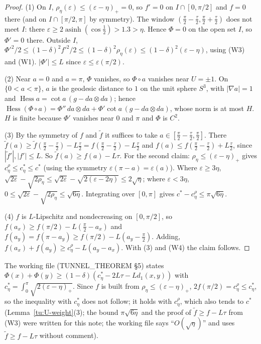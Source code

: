 \begin{proof}
(1) On $I$, $\rho_\eta(\varepsilon)\le(\varepsilon-\eta)_+=0$, so $f'=0$ on $I\cap[0,\pi/2]$ and $f=0$ there (and on
$I\cap[\pi/2,\pi]$ by symmetry). The window $(\frac\pi2-\frac\tau2,\frac\pi2+\frac\tau2)$ does not meet $I$: there
$\varepsilon\ge2\operatorname{asinh}(\cos\frac12)>1.3>\eta$. Hence $\Phi=0$ on the open set $I$, so $\Phi'=0$ there. Outside $I$,
$\Phi'^2/2\le(1-\delta)^2f'^2/2\le(1-\delta)^2\rho_\eta(\varepsilon)\le(1-\delta)^2(\varepsilon-\eta)$, using (W3) and (W1).
$|\Phi'|\le L$ since $\varepsilon\le\varepsilon(\pi/2)$.

(2) Near $a=0$ and $a=\pi$, $\Phi$ vanishes, so $\Phi\circ a$ vanishes near $U=\pm1$. On $\{0<a<\pi\}$, $a$ is the
geodesic distance to $1$ on the unit sphere $S^3$, with $|\nabla a|=1$ and
$\operatorname{Hess}a=\cot a\,(g-da\otimes da)$; hence
$\operatorname{Hess}(\Phi\circ a)=\Phi''\,da\otimes da+\Phi'\cot a\,(g-da\otimes da)$, whose norm is at most $H$. $H$ is finite
because $\Phi'$ vanishes near $0$ and $\pi$ and $\Phi$ is $C^2$.

(3) By the symmetry of $f$ and $\tilde f$ it suffices to take $a\in[\frac\pi2-\frac\tau2,\frac\pi2]$. There
$\tilde f(a)\ge\tilde f(\frac\pi2-\frac\tau2)-L\frac\tau2=f(\frac\pi2-\frac\tau2)-L\frac\tau2$ and
$f(a)\le f(\frac\pi2-\frac\tau2)+L\frac\tau2$, since $|\tilde f'|,|f'|\le L$. So $\tilde f(a)\ge f(a)-L\tau$. For the
second claim: $\rho_\eta\le(\varepsilon-\eta)_+$ gives $c^\rho_\eta\le c^*_\eta\le c^*$ (using the symmetry
$\varepsilon(\pi-a)=\varepsilon(a)$). Where $\varepsilon\ge3\eta$, $\sqrt{2\varepsilon}-\sqrt{2\rho_\eta}\le\sqrt{2\varepsilon}-\sqrt{2(\varepsilon-2\eta)}\le2\sqrt\eta$;
where $\varepsilon<3\eta$, $0\le\sqrt{2\varepsilon}-\sqrt{2\rho_\eta}\le\sqrt{6\eta}$. Integrating over $[0,\pi]$ gives
$c^*-c^\rho_\eta\le\pi\sqrt{6\eta}$.

(4) $f$ is $L$-Lipschitz and nondecreasing on $[0,\pi/2]$, so $f(a_x)\ge f(\pi/2)-L(\frac\pi2-a_x)$ and
$f(a_y)=f(\pi-a_y)\ge f(\pi/2)-L(a_y-\frac\pi2)$. Adding, $f(a_x)+f(a_y)\ge c^\rho_\eta-L(a_y-a_x)$. With (3) and (W4)
the claim follows.
\end{proof}

\begin{remark}\label{tu:U-weight-rem}
The working file (TUNNEL\_THEOREM \S5) states $\Phi(x)+\Phi(y)\ge(1-\delta)(c^*_\eta-2L\tau-Ld_1(x,y))$ with
$c^*_\eta=\int_0^\pi\sqrt{2(\varepsilon-\eta)_+}$. Since $f$ is built from $\rho_\eta\le(\varepsilon-\eta)_+$, $2f(\pi/2)=c^\rho_\eta\le c^*_\eta$,
so the inequality with $c^*_\eta$ does not follow; it holds with $c^\rho_\eta$, which also tends to $c^*$
(Lemma~\ref{tu:U-weight}(3); the bound $\pi\sqrt{6\eta}$ and the proof of $\tilde f\ge f-L\tau$ from (W3) were
written for this note; the working file says ``$O(\sqrt\eta)$'' and uses $\tilde f\ge f-L\tau$ without comment).
\end{remark}

